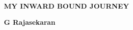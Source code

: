 \thispagestyle{empty}

\centerline{\Huge  {\bf MY INWARD BOUND JOURNEY} }
\vspace{2cm}
\centerline{\huge {\bf G Rajasekaran}}
\vfill
\vfill
\begin{figure}[H]
\begin{center}
\end{center}
\end{figure}
\vfill
\begin{center}
\end{center}

\newpage
~\thispagestyle{empty}
